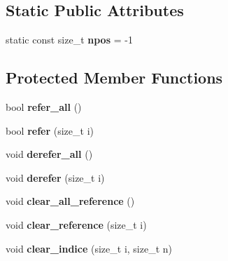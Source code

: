 \subsection*{Static Public Attributes}
\begin{CompactItemize}
\item 
\hypertarget{classbbt__string_37ee6487025e0088c0741ff4f946b8d1}{
static const size\_\-t \textbf{npos} = -1}
\label{classbbt__string_37ee6487025e0088c0741ff4f946b8d1}

\end{CompactItemize}
\subsection*{Protected Member Functions}
\begin{CompactItemize}
\item 
\hypertarget{classbbt__string_f7c2c97517b7c20277eef1674df243ec}{
bool \textbf{refer\_\-all} ()}
\label{classbbt__string_f7c2c97517b7c20277eef1674df243ec}

\item 
\hypertarget{classbbt__string_13d26f2c0a420af8c2dd0e8816b7d580}{
bool \textbf{refer} (size\_\-t i)}
\label{classbbt__string_13d26f2c0a420af8c2dd0e8816b7d580}

\item 
\hypertarget{classbbt__string_3783c467d4626d8a98276c3c6244fdf3}{
void \textbf{derefer\_\-all} ()}
\label{classbbt__string_3783c467d4626d8a98276c3c6244fdf3}

\item 
\hypertarget{classbbt__string_c176cd583a8923d9eea441e51531aedc}{
void \textbf{derefer} (size\_\-t i)}
\label{classbbt__string_c176cd583a8923d9eea441e51531aedc}

\item 
\hypertarget{classbbt__string_058842ef552babd3da2c6034a78cdf32}{
void \textbf{clear\_\-all\_\-reference} ()}
\label{classbbt__string_058842ef552babd3da2c6034a78cdf32}

\item 
\hypertarget{classbbt__string_f984e7160a01c9264604bb05d7d1d6d1}{
void \textbf{clear\_\-reference} (size\_\-t i)}
\label{classbbt__string_f984e7160a01c9264604bb05d7d1d6d1}

\item 
\hypertarget{classbbt__string_461e10300db61e31743e9c5dad9acc30}{
void \textbf{clear\_\-indice} (size\_\-t i, size\_\-t n)}
\label{classbbt__string_461e10300db61e31743e9c5dad9acc30}


\end{CompactItemize}
